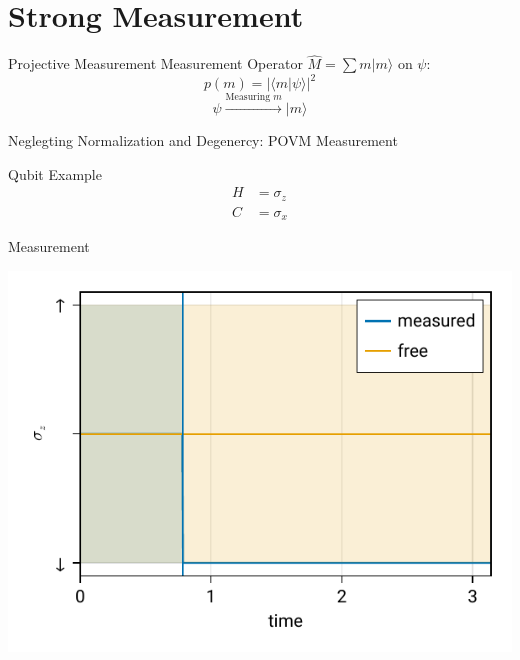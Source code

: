 \documentclass[handout]{beamer}
\begin{document}
\section{Strong Measurement}
\begin{frame}{Projective Measurement}
	Measurement Operator $\hat M = \sum m |m\rangle$ on $\psi$:
	$$p(m) = |\langle m|\psi\rangle|^2$$
	$$\psi \xrightarrow{\text{Measuring }m} |m\rangle$$

	{\small\textcolor{seegrau}{
		Neglegting Normalization and Degenercy:
		POVM Measurement
	}}

\end{frame}

\begin{frame}{Qubit Example}
	\begin{align*}
		H &= \sigma_z\\
		C &= \sigma_x
	\end{align*}	
\end{frame}

\begin{frame}{Measurement}
	\begin{center}
		\includegraphics{figures/03 measurement.pdf}
	\end{center}
\end{frame}
\end{document}
